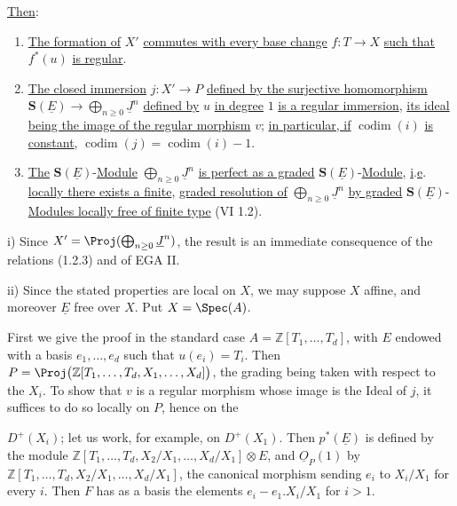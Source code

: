 \uline{Then}:
\begin{enumerate}[label=\roman*)]
\item \uline{The formation of} \(X'\) \uline{commutes with every base change} \(f:T\to X\) \uline{such that} \(f^*(u)\) \uline{is regular}.
\item \uline{The closed immersion} \(j:X'\to P\) \uline{defined by the surjective homomorphism} \(\mathbf{S}(\underline{E})\longrightarrow\bigoplus_{n\ge0}\underline{J}^n\) \uline{defined by} \(u\) \uline{in degree} \(1\) \uline{is a regular immersion}, \uline{its ideal being the image of the regular morphism} \(v\); \uline{in particular, if} \(\operatorname{codim}(i)\) \uline{is constant}, \(\operatorname{codim}(j)=\operatorname{codim}(i)-1\).
\item \uline{The} \(\mathbf{S}(\underline{E})\)-\uline{Module} \(\bigoplus_{n\ge0}\underline{J}^n\) \uline{is perfect as a graded} \(\mathbf{S}(\underline{E})\)-\uline{Module}, \uline{i}.\uline{e}. \uline{locally there exists a finite}, \uline{graded resolution of} \(\bigoplus_{n\ge0}\underline{J}^n\) \uline{by graded} \(\mathbf{S}(\underline{E})\)-\uline{Modules locally free of finite type} (VI 1.2).
\end{enumerate}

i) Since \(X'=\Proj(\bigoplus_{n\ge0}\underline{J}^n)\), the result is an immediate consequence of the relations (1.2.3) and of EGA II.

ii) Since the stated properties are local on \(X\), we may suppose \(X\) affine, and moreover \(\underline{E}\) free over \(X\). Put \(X=\Spec(A)\).

First we give the proof in the standard case \(A=\mathbb Z[T_1,\ldots,T_d]\), with \(E\) endowed with a basis \(e_1,\ldots,e_d\) such that \(u(e_i)=T_i\). Then \(P=\Proj\bigl(\mathbb Z[T_1,\ldots,T_d,X_1,\ldots,X_d]\bigr)\), the grading being taken with respect to the \(X_i\). To show that \(v\) is a regular morphism whose image is the Ideal of \(j\), it suffices to do so locally on \(P\), hence on the

%
\(D^+(X_i)\); let us work, for example, on \(D^+(X_1)\). Then \(p^*(\underline{E})\) is defined by the module \(\mathbb Z[T_1,\ldots,T_d,X_2/X_1,\ldots,X_d/X_1]\otimes E\), and \(\underline{O}_P(1)\) by \(\mathbb Z[T_1,\ldots,T_d,X_2/X_1,\ldots,X_d/X_1]\), the canonical morphism sending \(e_i\) to \(X_i/X_1\) for every \(i\). Then \(F\) has as a basis the elements \(e_i-e_1.X_i/X_1\) for \(i>1\).

